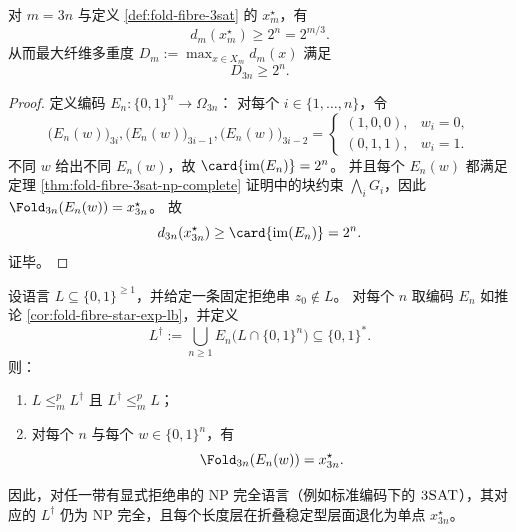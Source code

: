 \begin{corollary}[单一稳定型的显式指数纤维下界]\label{cor:fold-fibre-star-exp-lb}
对 \(m=3n\) 与定义 \ref{def:fold-fibre-3sat} 的 \(x^\star_m\)，有
\[
d_m(x^\star_m)\ge 2^n=2^{m/3}.
\]
从而最大纤维多重度 \(D_m:=\max_{x\in X_m}d_m(x)\) 满足
\[
D_{3n}\ge 2^n.
\]
\end{corollary}

\begin{proof}
定义编码 \(E_n:\{0,1\}^n\to\Omega_{3n}\)：
对每个 \(i\in\{1,\dots,n\}\)，令
\[
\bigl(E_n(w)\bigr)_{3i},\bigl(E_n(w)\bigr)_{3i-1},\bigl(E_n(w)\bigr)_{3i-2}
=
\begin{cases}
(1,0,0),& w_i=0,\\
(0,1,1),& w_i=1.
\end{cases}
\]
不同 \(w\) 给出不同 \(E_n(w)\)，故 \(\card{\mathrm{im}(E_n)}=2^n\)。
并且每个 \(E_n(w)\) 都满足定理 \ref{thm:fold-fibre-3sat-np-complete} 证明中的块约束 \(\bigwedge_i G_i\)，因此
\(
\Fold_{3n}(E_n(w))=x^\star_{3n}
\)。
故
\[
d_{3n}(x^\star_{3n})
\ge
\card{\mathrm{im}(E_n)}
=2^n.
\]
证毕。
\end{proof}

\begin{proposition}[长度层折叠退化下的复杂性保真编码]\label{prop:fold-layerwise-degenerate-hardness}
设语言 \(L\subseteq\{0,1\}^{\ge 1}\)，并给定一条固定拒绝串 \(z_0\notin L\)。
对每个 \(n\) 取编码 \(E_n\) 如推论 \ref{cor:fold-fibre-star-exp-lb}，并定义
\[
L^\dagger:=\bigcup_{n\ge 1}E_n\!\bigl(L\cap\{0,1\}^n\bigr)\subseteq\{0,1\}^\ast.
\]
则：
\begin{enumerate}
  \item \(L\le_m^p L^\dagger\) 且 \(L^\dagger\le_m^p L\)；
  \item 对每个 \(n\) 与每个 \(w\in\{0,1\}^n\)，有
  \[
  \Fold_{3n}(E_n(w))=x^\star_{3n}.
  \]
\end{enumerate}
因此，对任一带有显式拒绝串的 NP 完全语言（例如标准编码下的 \(\textsc{3SAT}\)），其对应的 \(L^\dagger\) 仍为 NP 完全，且每个长度层在折叠稳定型层面退化为单点 \(x^\star_{3n}\)。
\end{proposition}

